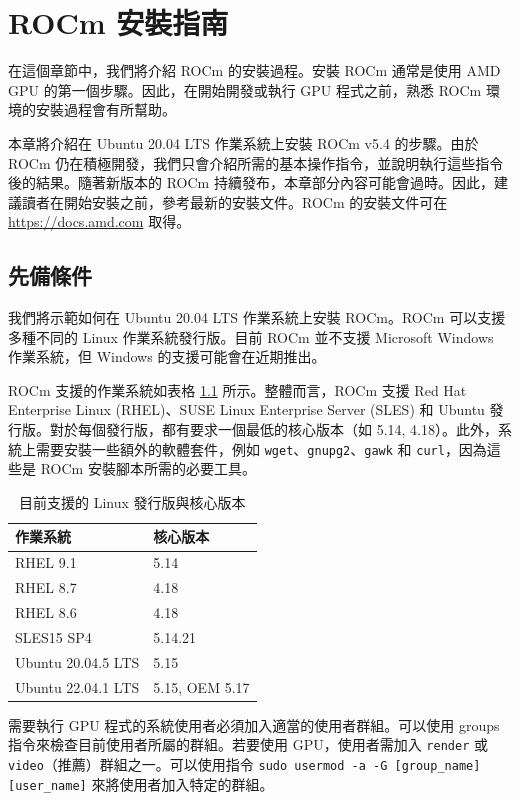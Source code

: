 \chapter{ROCm 安裝指南}\label{AppendiceA}

在這個章節中，我們將介紹 ROCm 的安裝過程。安裝 ROCm 通常是使用 AMD GPU 的第一個步驟。因此，在開始開發或執行 GPU 程式之前，熟悉 ROCm 環境的安裝過程會有所幫助。

本章將介紹在 Ubuntu 20.04 LTS 作業系統上安裝 ROCm v5.4 的步驟。由於 ROCm 仍在積極開發，我們只會介紹所需的基本操作指令，並說明執行這些指令後的結果。隨著新版本的 ROCm 持續發布，本章部分內容可能會過時。因此，建議讀者在開始安裝之前，參考最新的安裝文件。ROCm 的安裝文件可在 \url{https://docs.amd.com} 取得。

\section{先備條件}

我們將示範如何在 Ubuntu 20.04 LTS 作業系統上安裝 ROCm。ROCm 可以支援多種不同的 Linux 作業系統發行版。目前 ROCm 並不支援 Microsoft Windows 作業系統，但 Windows 的支援可能會在近期推出。

ROCm 支援的作業系統如表格 \ref{table:rocm_supported_distros_and_kernel_versions} 所示。整體而言，ROCm 支援 Red Hat Enterprise Linux (RHEL)、SUSE Linux Enterprise Server (SLES) 和 Ubuntu 發行版。對於每個發行版，都有要求一個最低的核心版本（如 5.14, 4.18）。此外，系統上需要安裝一些額外的軟體套件，例如 \lstinline|wget|、\lstinline|gnupg2|、\lstinline|gawk| 和 \lstinline|curl|，因為這些是 ROCm 安裝腳本所需的必要工具。


\begin{table}[h!]
\centering
\caption{目前支援的 Linux 發行版與核心版本}
\label{table:rocm_supported_distros_and_kernel_versions}
\begin{tabular}{ll}
\hline
\textbf{作業系統} & \textbf{核心版本} \\ \hline  
RHEL 9.1 & 5.14 \\ 
RHEL 8.7 & 4.18 \\ 
RHEL 8.6 & 4.18 \\ 
SLES15 SP4 & 5.14.21 \\ 
Ubuntu 20.04.5 LTS & 5.15 \\ 
Ubuntu 22.04.1 LTS & 5.15, OEM 5.17 \\ \hline 
\end{tabular}
\end{table}


需要執行 GPU 程式的系統使用者必須加入適當的使用者群組。可以使用 groups 指令來檢查目前使用者所屬的群組。若要使用 GPU，使用者需加入 \lstinline|render| 或 \lstinline|video|（推薦）群組之一。可以使用指令 \lstinline|sudo usermod -a -G [group_name] [user_name]| 來將使用者加入特定的群組。

